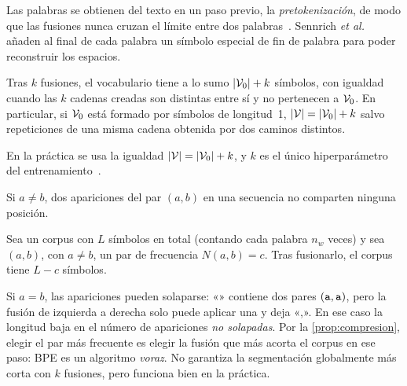 Las palabras se obtienen del texto en un paso previo, la \emph{pretokenización}, de modo que las fusiones nunca cruzan el límite entre dos palabras~\cite[§3.2]{sennrich}. Sennrich \emph{et al.} añaden al final de cada palabra un símbolo especial de fin de palabra para poder reconstruir los espacios.

\begin{proposicion}\label{prop:tam-vocab}
Tras $k$ fusiones, el vocabulario tiene a lo sumo $\lvert\mathcal{V}_0\rvert+k$ símbolos, con igualdad cuando las $k$ cadenas creadas son distintas entre sí y no pertenecen a $\mathcal{V}_0$. En particular, si $\mathcal{V}_0$ está formado por símbolos de longitud~1, $\lvert\mathcal{V}\rvert=\lvert\mathcal{V}_0\rvert+k$ salvo repeticiones de una misma cadena obtenida por dos caminos distintos.
\end{proposicion}

En la práctica se usa la igualdad $\lvert\mathcal{V}\rvert=\lvert\mathcal{V}_0\rvert+k$, y $k$ es el único hiperparámetro del entrenamiento~\cite[§3.2]{sennrich}.

\begin{lema}\label{lem:solape}
Si $a\neq b$, dos apariciones del par $(a,b)$ en una secuencia no comparten ninguna posición.
\end{lema}

\begin{proposicion}\label{prop:compresion}
Sea un corpus con $L$ símbolos en total (contando cada palabra $n_w$ veces) y sea $(a,b)$, con $a\neq b$, un par de frecuencia $N(a,b)=c$. Tras fusionarlo, el corpus tiene $L-c$ símbolos.
\end{proposicion}

\begin{observacion}
Si $a=b$, las apariciones pueden solaparse: «» contiene dos pares $(\texttt{a},\texttt{a})$, pero la fusión de izquierda a derecha solo puede aplicar una y deja «\sep{}». En ese caso la longitud baja en el número de apariciones \emph{no solapadas}. Por la \cref{prop:compresion}, elegir el par más frecuente es elegir la fusión que más acorta el corpus en ese paso: BPE es un algoritmo \emph{voraz}. No garantiza la segmentación globalmente más corta con $k$ fusiones, pero funciona bien en la práctica.
\end{observacion}

\addtocounter{definicion}{1}%

